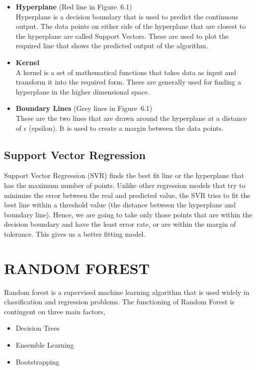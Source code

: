 \begin{itemize}
\item \textbf{Hyperplane} (Red line in Figure~6.1) \\ Hyperplane is a
  decision boundary that is used to predict the continuous output. The
  data points on either side of the hyperplane that are closest to the
  hyperplane are called Support Vectors. These are used to plot the
  required line that shows the predicted output of the algorithm.
\item \textbf{Kernel} \\ A kernel is a set of mathematical functions
  that takes data as input and transform it into the required
  form. These are generally used for finding a hyperplane in the
  higher dimensional space.
\item \textbf{Boundary Lines} (Grey lines in Figure~6.1) \\ These are
  the two lines that are drawn around the hyperplane at a distance of
  \textbf{$\epsilon$} (epsilon). It is used to create a margin between
  the data points.
\end{itemize}

\subsection{Support Vector Regression}

Support Vector Regression (SVR) finds the best fit line or the
hyperplane that has the maximum number of points. Unlike other
regression models that try to minimize the error between the real and
predicted value, the SVR tries to fit the best line within a threshold
value (the distance between the hyperplane and boundary line).  Hence,
we are going to take only those points that are within the decision
boundary and have the least error rate, or are within the margin of
tolerance. This gives us a better fitting model.


\section{RANDOM FOREST}

Random forest is a supervised machine learning algorithm that is used
widely in classification and regression problems. The functioning of
Random Forest is contingent on three main factors,
\begin{itemize}
\item Decision Trees
\item Ensemble Learning
\item Bootstrapping
\end{itemize}

